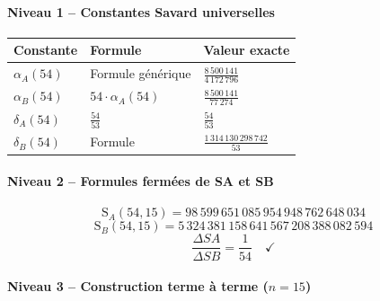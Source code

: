 \documentclass[11pt,a4paper]{article}
\newcommand{\SA}{\mathrm{S}_A}
\newcommand{\SB}{\mathrm{S}_B}
\begin{document}
\vspace{0.3cm}

\paragraph{Niveau 1 -- Constantes Savard universelles}

\begin{center}
\small
\begin{tabular}{@{}lll@{}}
\toprule
\rowcolor{spectralgris}
\textbf{Constante} & \textbf{Formule} & \textbf{Valeur exacte} \\
\midrule
$\alpha_A(54)$ & Formule générique & $\frac{8\,500\,141}{4\,172\,796}$ \\
$\alpha_B(54)$ & $54 \cdot \alpha_A(54)$ & $\frac{8\,500\,141}{77\,274}$ \\
$\delta_A(54)$ & $\frac{54}{53}$ & $\frac{54}{53}$ \\
$\delta_B(54)$ & Formule & $\frac{1\,314\,130\,298\,742}{53}$ \\
\bottomrule
\end{tabular}
\end{center}

\vspace{0.3cm}

\paragraph{Niveau 2 -- Formules fermées de SA et SB}

$$\SA(54, 15) = 98\,599\,651\,085\,954\,948\,762\,648\,034$$
$$\SB(54, 15) = 5\,324\,381\,158\,641\,567\,208\,388\,082\,594$$
$$\frac{\Delta SA}{\Delta SB} = \frac{1}{54} \quad \checkmark$$

\vspace{0.3cm}

\paragraph{Niveau 3 -- Construction terme à terme ($n = 15$)}
\end{document}
